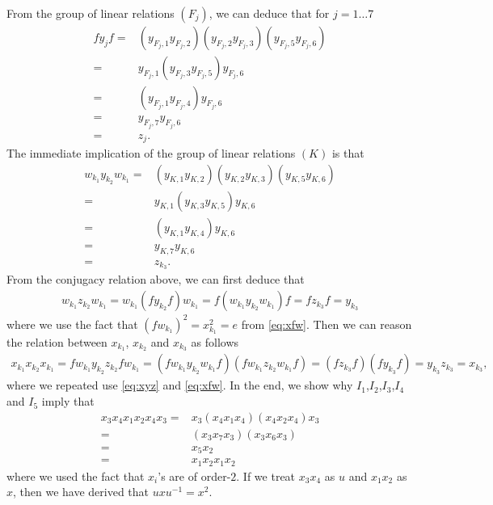 From the group of linear relations $(F_j)$, we can deduce that for $j = 1 \dots 7$
\begin{align}
	f y_j f =& (y_{F_j,1} y _{F_j,2})(y_{F_j,2} y _{F_j,3})(y_{F_j,5} y_{F_j,6}) \\
	=&y_{F_j,1} (y_{F_j,3} y_{F_j,5}) y_{F_j,6} \\
	=& (y_{F_j,1} y_{F_j,4}) y_{F_j,6} \\
	=& y_{F_j,7} y_{F_j,6}\\
	=&z_j.
\end{align}
The immediate implication of the group of linear relations $(K)$ is that 
\begin{align}
	w_{k_1} y_{k_2} w_{k_1} =& (y_{K,1} y _{K,2})(y_{K,2} y _{K,3})(y_{K,5} y_{K,6}) \\
	=&y_{K,1} (y_{K,3} y_{K,5}) y_{K,6} \\
	=& (y_{K,1} y_{K,4}) y_{K,6} \\
	=& y_{K,7} y_{K,6}\\
	=&z_{k_3}.
\end{align}
From the conjugacy relation above, we can first deduce that 
\begin{align}
	w_{k_1}z_{k_2}w_{k_1} = w_{k_1}(f y_{k_2} f) w_{k_1} = f(w_{k_1}y_{k_2}w_{k_1}) f = fz_{k_3}f = y_{k_3}
\end{align}
where we use the fact that $(fw_{k_1})^2 = x_{k_1}^2 = e$ from \cref{eq:xfw}.
Then we can reason the relation between $x_{k_1}$, $x_{k_2}$ and $x_{k_3}$ as
follows
\begin{align}
	x_{k_1}x_{k_2}x_{k_1} = fw_{k_1}y_{k_2}z_{k_2}fw_{k_1} = (fw_{k_1}y_{k_2}w_{k_1}f)(fw_{k_1}z_{k_2}w_{k_1}f)
	=(fz_{k_3}f)(fy_{k_3}f) = y_{k_3}z_{k_3} = x_{k_3},
\end{align}
where we repeated use \cref{eq:xyz} and \cref{eq:xfw}.
In the end, we show why $I_1$,$I_2$,$I_3$,$I_4$ and $I_5$ imply that 
\begin{align}
	x_3 x_4 x_1x_2 x_4 x_3 =& x_3 (x_4 x_1x_4) (x_4x_2 x_4) x_3 \\
	=& (x_3 x_7 x_3) (x_3 x_6 x_3)\\
	=& x_5 x_2\\
	=& x_1x_2x_1 x_2
\end{align}
where we used the fact that $x_i$'s are of order-$2$.
If we treat $x_3x_4$ as $u$ and $x_1x_2$ as $x$, then we have derived that $uxu^{-1} = x^2$.

